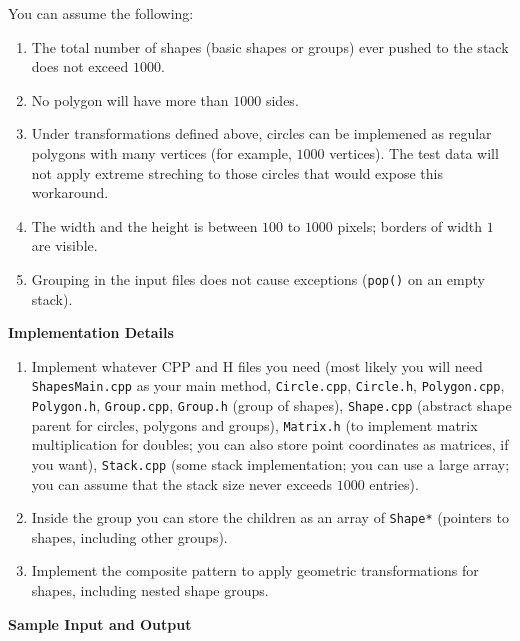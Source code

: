 \documentclass[11pt]{article}
\begin{document}
You can assume the following:

\begin{enumerate}
\item The total number of shapes (basic shapes or groups) ever pushed to the stack does not exceed $1000$. 
\item No polygon will have more than $1000$ sides.
\item Under transformations defined above, circles can be 
implemened as regular polygons with many vertices
(for example, $1000$ vertices). The test data will not apply extreme 
streching to those circles that would expose this workaround.
\item The width and the height is between $100$ to $1000$ pixels; borders of width $1$ are visible. 
\item Grouping in the input files does not cause exceptions ({\tt pop()} on an empty stack). 
\end{enumerate}


\vspace{20pt}
{\bf \large Implementation Details}

\begin{enumerate}
\item Implement whatever CPP and H files you need
(most likely you will need {\tt ShapesMain.cpp} as your main method, 
{\tt Circle.cpp}, {\tt Circle.h}, {\tt Polygon.cpp}, {\tt Polygon.h}, 
{\tt Group.cpp}, {\tt Group.h} (group of shapes), 
{\tt Shape.cpp} (abstract shape parent for circles, polygons and groups), 
{\tt Matrix.h} (to implement matrix multiplication for doubles; you can 
also store point coordinates as matrices, if you want), 
{\tt Stack.cpp} (some stack implementation; you can use a large array; 
you can assume that the stack size never exceeds $1000$ entries).
\item Inside the group you can store the children as an 
array of {\tt Shape*} (pointers to shapes, including other groups).
\item Implement the composite pattern to apply geometric transformations
for shapes, including nested shape groups. 
\end{enumerate}

\vspace{20pt}
{\bf \large Sample Input and Output}\\
\end{document}
